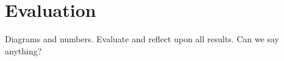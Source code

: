 \section{Evaluation}
\label{sec:evaluation}
Diagrams and numbers. Evaluate and reflect upon all results. Can we say anything?